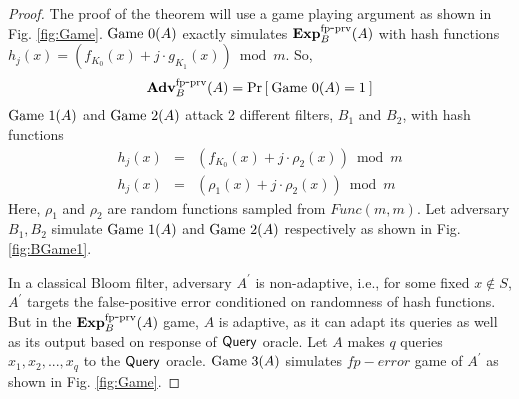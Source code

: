 \begin{proof}
The proof of the theorem will use a game playing argument as shown in Fig. \ref{fig:Game}. $\text{Game 0}(A)$ exactly simulates $\mathrm{\mathbf{Exp}}^{\mathrm{fp\mbox{-}prv}}_{B}(A)$ with hash functions $h_j(x) = \left( f_{K_0}(x) + j\cdot g_{K_1}(x)\right) \bmod m$. So,
\begin{equation}
\mathrm{\mathbf{Adv}}^{\mathrm{fp\mbox{-}prv}}_{B}(A) = \Pr\left[\: \text{Game 0}(A)=1 \:\right]\label{eq:0}
\end{equation}
 $\text{Game 1}(A)$ and $\text{Game 2}(A)$ attack 2 different filters, $B_1$ and $B_2$, with hash functions 
\begin{eqnarray*}
h_j(x) &=& ( f_{K_0}(x) + j\cdot \rho_2(x)) \bmod m\\
h_j(x) &=& ( \rho_1(x) + j \cdot \rho_2(x)) \bmod m 
\end{eqnarray*}
Here, $\rho_1$ and $\rho_2$ are random functions sampled from $Func(m,m)$. Let adversary $B_1, B_2$ simulate $\text{Game 1}(A)$ and $\text{Game 2}(A)$ respectively as shown in Fig. \ref{fig:BGame1}.

\par{In a classical Bloom filter, adversary $A^{'}$ is non-adaptive, i.e., for some fixed $x \notin S$, $A^{'}$ targets the false-positive error conditioned on randomness of hash functions. But in the $\mathrm{\mathbf{Exp}}^{\mathrm{fp\mbox{-}prv}}_{B}(A)$ game, $A$ is adaptive, as it can adapt its queries as well as its output based on response of $\mathsf{Query}$ oracle. Let $A$ makes $q$ queries $x_1, x_2, ..., x_q$ to the $\mathsf{Query}$ oracle. $\text{Game 3}(A)$ simulates $fp-error$ game of $A^{'}$ as shown in Fig. \ref{fig:Game}.}


\end{proof}
